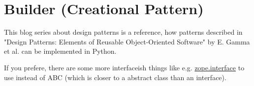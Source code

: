 \documentclass{article}
\begin{document}
  \section{Builder (Creational Pattern)}

  This blog series about design patterns is a reference, how patterns
  described in "Design Patterns: Elements of Reusable Object-Oriented Software"
  by E. Gamma et al. can be implemented in Python.

  If you prefere, there are some more interfaceish things like e.g.
  \href{https://zopeinterface.readthedocs.io/en/latest/index.html}{zope.interface}
  to use instead of ABC (which is closer to a abstract class than an interface).

  \subsection{}
\end{document}
